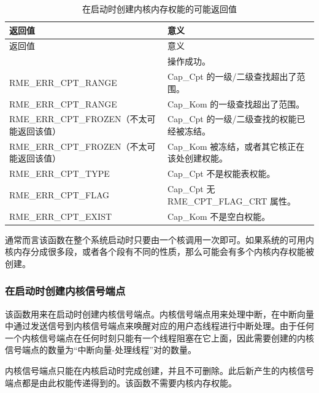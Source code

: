 \begin{xltabular}{\textwidth}{@{}>{\hsize\raggedright\arraybackslash}X>{\hsize\raggedright\arraybackslash}X@{}}
\caption{在启动时创建内核内存权能的可能返回值}\label{tab:7-56-create-kernel-memory-capability-at-boot-return-values}\\
\toprule
返回值 & 意义\tabularnewline
\endfirsthead
\toprule
返回值 & 意义\tabularnewline
\midrule
\endhead
\bottomrule
{} & 操作成功。\tabularnewline
    RME\_ERR\_CPT\_RANGE & Cap\_Cpt 的一级/二级查找超出了范围。\tabularnewline
    RME\_ERR\_CPT\_RANGE & Cap\_Kom 的一级查找超出了范围。\tabularnewline
    RME\_ERR\_CPT\_FROZEN（不太可能返回该值） & Cap\_Cpt 的一级/二级查找的权能已经被冻结。\tabularnewline
    RME\_ERR\_CPT\_FROZEN（不太可能返回该值） & Cap\_Kom 被冻结，或者其它核正在该处创建权能。\tabularnewline
    RME\_ERR\_CPT\_TYPE & Cap\_Cpt 不是权能表权能。\tabularnewline
    RME\_ERR\_CPT\_FLAG & Cap\_Cpt 无 RME\_CPT\_FLAG\_CRT 属性。\tabularnewline
    RME\_ERR\_CPT\_EXIST & Cap\_Kom 不是空白权能。\tabularnewline
\end{xltabular}

通常而言该函数在整个系统启动时只要由一个核调用一次即可。如果系统的可用内核内存分成很多段，或者各个段有不同的性质，那么可能会有多个内核内存权能被创建。

\subsubsection{在启动时创建内核信号端点}\label{subsubsec:7-create-kernel-signal-endpoint-at-boot}

该函数用来在启动时创建内核信号端点。内核信号端点用来处理中断，在中断向量中通过发送信号到内核信号端点来唤醒对应的用户态线程进行中断处理。由于任何一个内核信号端点在任何时刻只能有一个线程阻塞在它上面，因此需要创建的内核信号端点的数量为``中断向量-处理线程''对的数量。

内核信号端点只能在内核启动时完成创建，并且不可删除。此后新产生的内核信号端点都是由此权能传递得到的。该函数不需要内核内存权能。

